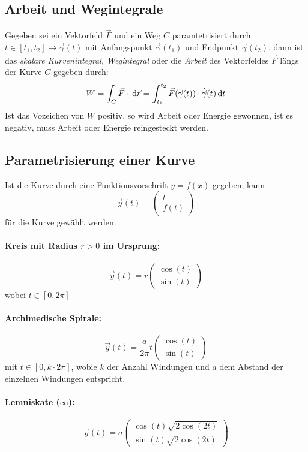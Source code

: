 \subsection{Arbeit und Wegintegrale}
Gegeben sei ein Vektorfeld $\vec{F}$ und ein Weg $C$ paramtetrisiert durch
$t\in[t_1,t_2] \mapsto \vec{\gamma}(t)$ mit Anfangspunkt $\vec{\gamma}(t_1)$ und
Endpunkt $\vec{\gamma}(t_2)$, dann ist das \textit{skalare Kurvenintegral, Wegintegral}
oder die \textit{Arbeit} des Vektorfeldes $\vec{F}$ längs der Kurve $C$ gegeben durch:
\[ W = \int_C \vec{F}\cdot\,\mathrm{d}\vec{r}=\int_{t_1}^{t_2}\vec{F}(\vec{\gamma}(t)) \cdot 
	\dot{\vec{\gamma}}(t)\,\mathrm{d} t \]
Ist das Vozeichen von $W$ positiv, so wird Arbeit oder Energie gewonnen, ist es negativ,
muss Arbeit oder Energie reingesteckt werden.

\subsection{Parametrisierung einer Kurve}
Ist die Kurve durch eine Funktionsvorschrift $y=f(x)$ gegeben, kann
\[ \vec{y}(t) = \begin{pmatrix} t \\ f(t) \end{pmatrix} \]
für die Kurve gewählt werden.
\paragraph{Kreis mit Radius $r > 0$ im Ursprung:}
\[ \vec{y}(t) = r\begin{pmatrix} \cos(t) \\ \sin(t) \end{pmatrix} \]
wobei $t\in[0,2\pi]$
\paragraph{Archimedische Spirale:}
\[ \vec{y}(t) = \frac{a}{2\pi}t\begin{pmatrix} \cos(t) \\ \sin(t) \end{pmatrix} \]
mit $t\in[0,k\cdot 2\pi]$, wobie $k$ der Anzahl Windungen und $a$ dem Abstand der einzelnen
Windungen entspricht.
\paragraph{Lemniskate ($\infty$):}
\[ \vec{y}(t) = a\begin{pmatrix} \cos(t)\sqrt{2\cos(2t)} \\ \sin(t)\sqrt{2\cos(2t)} \end{pmatrix} \]


